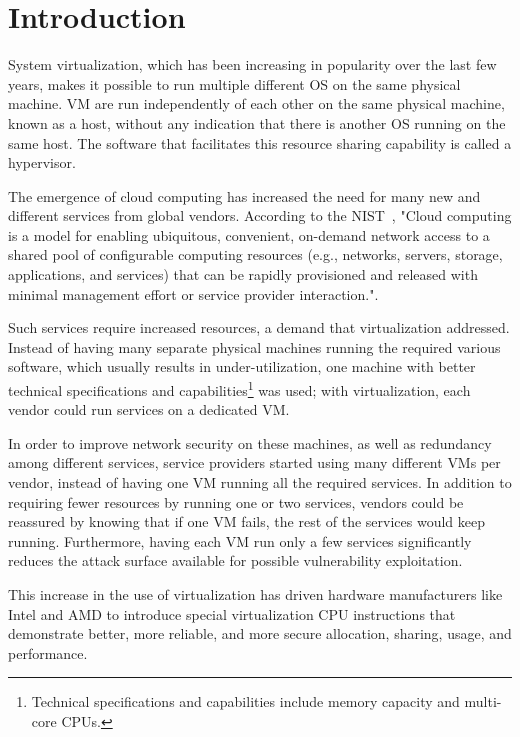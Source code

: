 \chapter{Introduction}\label{ch:intro}

System virtualization, which has been increasing in popularity over the last few years, makes it possible to run multiple different \ac{OS} on the same physical machine. \ac{VM} are run independently of each other on the same physical machine, known as a host, without any indication that there is another \ac{OS} running on the same host. The software that facilitates this resource sharing capability is called a hypervisor.

\par The emergence of cloud computing has increased the need for many new and different services from global vendors. According to the \ac{NIST}~\cite{mell2011nist}, "Cloud computing is a model for enabling ubiquitous, convenient, on-demand network access to a shared pool of configurable computing resources (e.g., networks, servers, storage, applications, and services) that can be rapidly provisioned and released with minimal management effort or service provider interaction.".  

\par Such services require increased resources, a demand that virtualization addressed. Instead of having many separate physical machines running the required various software, which usually results in under-utilization, one machine with better technical specifications and capabilities\footnote{Technical specifications and capabilities include memory capacity and multi-core \acp{CPU}.} was used; with virtualization, each vendor could run services on a dedicated \ac{VM}. 

\par In order to improve network security on these machines, as well as redundancy among different services, service providers started using many different \acp{VM} per vendor, instead of having one \ac{VM} running all the required services. In addition to requiring fewer resources by running one or two services, vendors could be reassured by knowing that if one VM fails, the rest of the services would keep running. Furthermore, having each \ac{VM} run only a few services significantly reduces the attack surface available for possible vulnerability exploitation.

\par This increase in the use of virtualization has driven hardware manufacturers like Intel and AMD to introduce special virtualization \ac{CPU} instructions that demonstrate better, more reliable, and more secure allocation, sharing, usage, and performance.


